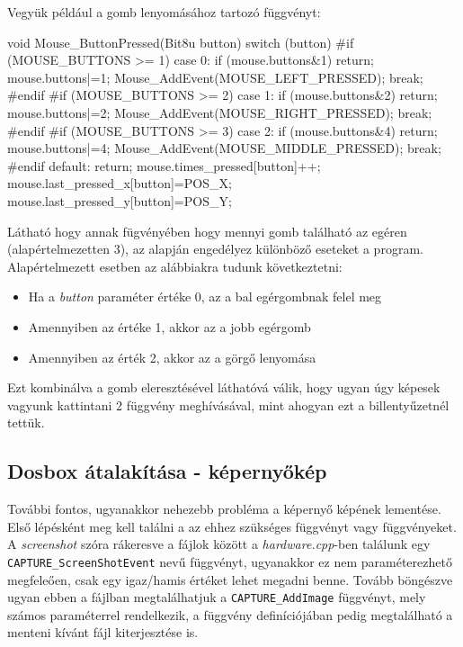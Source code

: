 Vegyük például a gomb lenyomásához tartozó függvényt:
\begin{cpp}

    void Mouse_ButtonPressed(Bit8u button) {
            switch (button) {
        #if (MOUSE_BUTTONS >= 1)
            case 0:
                if (mouse.buttons&1) return;
                mouse.buttons|=1;
                Mouse_AddEvent(MOUSE_LEFT_PRESSED);
                break;
        #endif
        #if (MOUSE_BUTTONS >= 2)
            case 1:
                if (mouse.buttons&2) return;
                mouse.buttons|=2;
                Mouse_AddEvent(MOUSE_RIGHT_PRESSED);
                break;
        #endif
        #if (MOUSE_BUTTONS >= 3)
            case 2:
                if (mouse.buttons&4) return;
                mouse.buttons|=4;
                Mouse_AddEvent(MOUSE_MIDDLE_PRESSED);
                break;
        #endif
            default:
                return;
            }
        mouse.times_pressed[button]++;
        mouse.last_pressed_x[button]=POS_X;
        mouse.last_pressed_y[button]=POS_Y;
    }

\end{cpp}

Látható hogy annak fügvényében hogy mennyi gomb található az egéren (alapértelmezetten 3), az alapján engedélyez különböző eseteket a program. Alapértelmezett esetben az alábbiakra tudunk következtetni:

\begin{itemize}
    \item Ha a \textit{button} paraméter értéke 0, az a bal egérgombnak felel meg
    \item Amennyiben az értéke 1, akkor az a jobb egérgomb
    \item Amennyiben az érték 2, akkor az a görgő lenyomása
\end{itemize}

Ezt kombinálva a gomb eleresztésével láthatóvá válik, hogy ugyan úgy képesek vagyunk kattintani 2 függvény meghívásával, mint ahogyan ezt a billentyűzetnél tettük.

\subsection{Dosbox átalakítása - képernyőkép}

További fontos, ugyanakkor nehezebb probléma a képernyő képének lementése. Első lépésként meg kell találni a az ehhez szükséges függvényt vagy függvényeket. 
A \textit{screenshot} szóra rákeresve a fájlok között a \textit{hardware.cpp}-ben találunk egy\\ \verb|CAPTURE_ScreenShotEvent| nevű függvényt, ugyanakkor ez nem paraméterezhető megfeleően, csak egy igaz/hamis értéket lehet megadni benne. 
Tovább böngészve ugyan ebben a fájlban megtalálhatjuk a \verb|CAPTURE_AddImage| függvényt, mely számos paraméterrel rendelkezik, a függvény definíciójában pedig megtalálható a menteni kívánt fájl kiterjesztése is.

